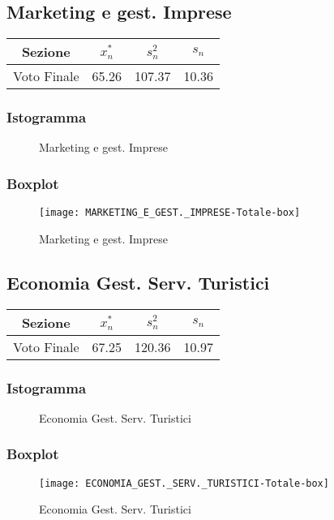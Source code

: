\thispagestyle{empty} %
\subsection{Marketing e gest. Imprese}

\begin{center}
\begin{tabular}{|c|c|c|c|}
  \hline
  Sezione & \(x_{n}^{*}\) & \(s_n^2\) & \(s_n\) \\
  \hline
  Voto Finale & 65.26 & 107.37 & 10.36 \\
  \hline
\end{tabular}
\end{center}

\subsubsection{Istogramma}
\begin{figure}[!h]
  \caption{Marketing e gest. Imprese}
\end{figure}

\subsubsection{Boxplot}
\begin{figure}[!h]
  \centering
  \texttt{[image: MARKETING\_E\_GEST.\_IMPRESE-Totale-box]}
  \caption{Marketing e gest. Imprese}
\end{figure}
\restoregeometry
\clearpage

\thispagestyle{empty} %
\subsection{Economia Gest. Serv. Turistici}

\begin{center}
\begin{tabular}{|c|c|c|c|}
  \hline
  Sezione & \(x_{n}^{*}\) & \(s_n^2\) & \(s_n\) \\
  \hline
  Voto Finale & 67.25 & 120.36 & 10.97 \\
  \hline
\end{tabular}
\end{center}

\subsubsection{Istogramma}
\begin{figure}[!h]
  \caption{Economia Gest. Serv. Turistici}
\end{figure}

\subsubsection{Boxplot}
\begin{figure}[!h]
  \centering
  \texttt{[image: ECONOMIA\_GEST.\_SERV.\_TURISTICI-Totale-box]}
  \caption{Economia Gest. Serv. Turistici}
\end{figure}
\restoregeometry
\clearpage

